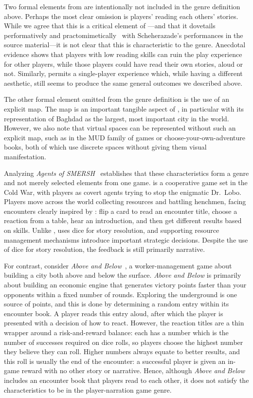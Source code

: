 \documentclass[a4paper]{article}
\begin{document}
Two formal elements from \totan{} are intentionally not included in the
genre definition above. Perhaps the most clear omission is players' reading
each others' stories. While we agree that this is a critical element of 
\totan{}---and that it dovetails performatively 
and practomimetically~\citep{Travis2011} with Scheherazade's
performances in the source material---it is not clear that this is
characteristic to the genre.  Anecdotal evidence shows that
players with low reading skills can ruin the play experience for other
players, while those players could have read their own stories, aloud or not.
Similarly, \totan{} permits a single-player experience which, while
having a different aesthetic, still seems to produce the same general outcomes
we described above.

The other formal element omitted from the genre definition is the use of an
explicit map. The map is an important tangible aspect of \totan{}, 
in particular with its representation of Baghdad as the largest, most
important city in the world. However, we also note that virtual spaces
can be represented without such an explicit map, such as in the MUD family
of games or choose-your-own-adventure books, both of which
use discrete spaces without giving them visual manifestation.

Analyzing \textit{Agents of SMERSH}~\citep{Maxwell2012} establishes that
these characteristics form a genre and not merely selected elements from one
game.
\smersh{} is a cooperative game set in the Cold War, with players as 
covert agents trying to stop the enigmatic Dr.\ Lobo. 
Players move across the world collecting resources and battling henchmen,
facing encounters clearly inspired by \totan{}: flip a card to read an
encounter title, choose a reaction from a table, hear an introduction,
and then get different results based on skills. Unlike \totan{},
\smersh{} uses dice for story resolution, and supporting resource
management mechanisms introduce important strategic decisions.
Despite the use of dice for story resolution, the feedback is still
primarily narrative.

For contrast, consider \textit{Above and Below}~\citep{Laukat2015}, a
worker-management game about building a city both above and below the
surface.  \textit{Above and Below} is primarily about building an
economic engine that generates victory points faster than your
opponents within a fixed number of rounds. Exploring the underground
is one source of points, and this is done by determining a random
entry within its encounter book.  A player reads this entry aloud,
after which the player is presented with a decision of how to
react. However, the reaction titles are a thin wrapper around a
risk-and-reward balance: each has a number which is the number of
successes required on dice rolls, so players choose the highest number
they believe they can roll. Higher numbers always equate to better results,
and this roll is usually the end of the encounter: a successful player
is given an in-game reward with no other story or narrative.
Hence, although \textit{Above and Below} includes an encounter book
that players read to each other, it does not satisfy the characteristics
to be in the player-narration game genre.
\end{document}
